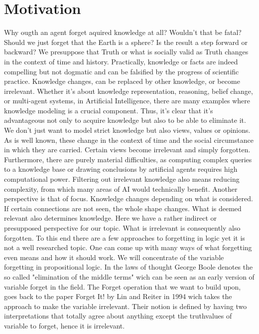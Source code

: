 \section{Motivation}
Why ougth an agent forget aquired knowledge at all? Wouldn't that be fatal? Should we just forget that the Earth is a sphere? Is the result a step forward or backward?
We presuppose that Truth or what is socially valid as Truth changes in the context of time and history. Practically, knowledge or facts are indeed compelling but not dogmatic 
and can be falsified by the progress of scientific practice. Knowledge changes, can be replaced by other knowledge, or become irrelevant. Whether it's about knowledge representation, 
reasoning, belief change, or multi-agent systems, in Artificial Intelligence, there are many examples where knowledge modeling is a crucial component. Thus, it's clear that it's 
advantageous not only to acquire knowledge but also to be able to eliminate it. We don't just want to model strict knowledge but also views, values or opinions. As is well known, 
these change in the context of time and the social circumstance in which they are carried. Certain views become irrelevant and simply forgotten.
Furthermore, there are purely material difficulties, as computing complex queries to a knowledge base or drawing conclusions by artificial agents requires high computational power. 
Filtering out irrelevant knowledge also means reducing complexity, from which many areas of AI would technically benefit. Another perspective is that of focus. Knowledge changes 
depending on what is considered. If certain connections are not seen, the whole shape changes. What is deemed relevant also determines knowledge. Here we have a rather indirect or 
presupposed perspective for our topic. What is irrelevant is consequently also forgotten.
To this end there are a few approaches to forgetting in logic yet it is not a well researched topic. One can come up with many ways of what forgetting even means and how it should work.
We will concentrate of the variable forgetting in propositional logic. In the laws of thought \cite{boole2021investigation} George Boole denotes the so called 
"elimination of the middle terms" wich can be seen as an early version of variable forget in the field.
The Forget operation that we want to build upon, goes back to the paper Forget It! \cite{lin1994forget} by Lin and Reiter in 1994 wich takes the approach to make the variable irrelevant. 
Their notion is defined by having two interpretations that totally agree about anything except the truthvalues of variable to forget, hence it is irrelevant.
